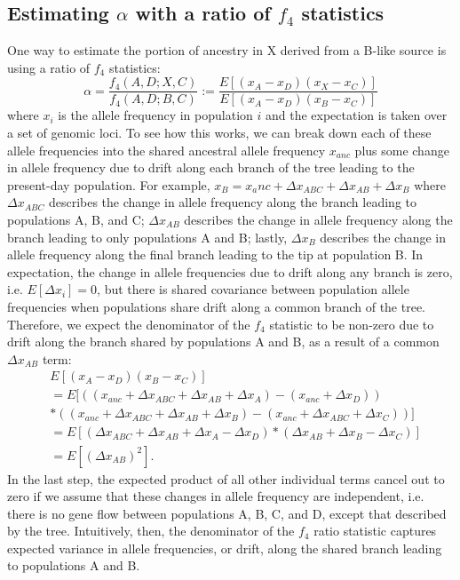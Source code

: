 \documentclass[12pt]{report}
\begin{document}
\subsection{Estimating $\alpha$ with a ratio of $f_4$ statistics}
One way to estimate the portion of ancestry in X derived from a B-like source is using a ratio of $f_4$ statistics:
\begin{equation}
\alpha = \frac{f_4(A,D;X,C)}{f_4(A,D;B,C)} := \frac{E[(x_A - x_D)(x_X - x_C)]}{E[(x_A - x_D)(x_B - x_C)]}
\end{equation}
where $x_i$ is the allele frequency in population $i$ and the expectation is taken over a set of genomic loci. To see how this works, we can break down each of these allele frequencies into the shared ancestral allele frequency $x_{anc}$ plus some change in allele frequency due to drift along each branch of the tree leading to the present-day population. For example, $x_B = x_anc + \Delta{x_{ABC}} + \Delta{x_{AB}} + \Delta{x_B}$ where $\Delta{x_{ABC}}$ describes the change in allele frequency along the branch leading to populations A, B, and C; $\Delta{x_{AB}}$ describes the change in allele frequency along the branch leading to only populations A and B; lastly, $\Delta{x_B}$ describes the change in allele frequency along the final branch leading to the tip at population B. In expectation, the change in allele frequencies due to drift along any branch is zero, i.e. $E[\Delta{x_i}]=0$, but there is shared covariance between population allele frequencies when populations share drift along a common branch of the tree. Therefore, we expect the denominator of the $f_4$ statistic to be non-zero due to drift along the branch shared by populations A and B, as a result of a common $\Delta{x_{AB}}$ term:
\begin{align*}
&E[(x_A - x_D)(x_B - x_C)] \\
&= E[((x_{anc} + \Delta{x_{ABC}} + \Delta{x_{AB}} + \Delta{x_{A}}) - (x_{anc} + \Delta{x_{D}})) \\
&*((x_{anc} + \Delta{x_{ABC}} + \Delta{x_{AB}} + \Delta{x_B}) - (x_{anc} + \Delta{x_{ABC}} + \Delta{x_C}))] \\
&=E[(\Delta{x_{ABC}} + \Delta{x_{AB}} + \Delta{x_{A}} - \Delta{x_{D}})*(\Delta{x_{AB}} + \Delta{x_B} - \Delta{x_C})]\\
&=E[(\Delta{x_{AB}})^2].
\end{align*}
In the last step, the expected product of all other individual terms cancel out to zero if we assume that these changes in allele frequency are independent, i.e. there is no gene flow between populations A, B, C, and D, except that described by the tree. Intuitively, then, the denominator of the $f_4$ ratio statistic captures expected variance in allele frequencies, or drift, along the shared branch leading to populations A and B.\par
\end{document}
